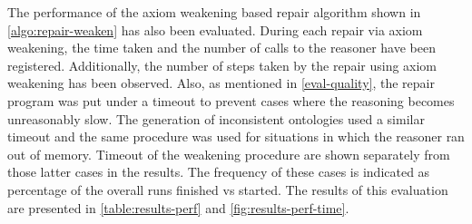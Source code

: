 
The performance of the axiom weakening based repair algorithm shown in \cref{algo:repair-weaken} has also been evaluated. During each repair via axiom weakening, the time taken and the number of calls to the reasoner have been registered. Additionally, the number of steps taken by the repair using axiom weakening has been observed. Also, as mentioned in \cref{eval-quality}, the repair program was put under a timeout to prevent cases where the reasoning becomes unreasonably slow. The generation of inconsistent ontologies used a similar timeout and the same procedure was used for situations in which the reasoner ran out of memory. Timeout of the weakening procedure are shown separately from those latter cases in the results. The frequency of these cases is indicated as percentage of the overall runs finished vs started. The results of this evaluation are presented in \cref{table:results-perf} and \cref{fig:results-perf-time}.

